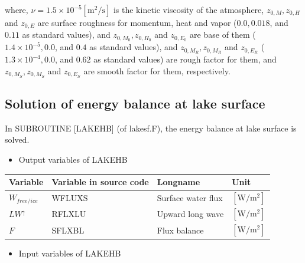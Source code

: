 where, \(\nu = 1.5 \times 10^{-5} \mathrm{[m^2/s]}\) is the kinetic viscosity of the atmosphere, \(z_{0,M},z_{0,H}\) and \(z_{0,E}\) are surface roughness for momentum, heat and vapor (\(0.0, 0.018\),
and \(0.11\) as standard values), and \(z_{0,M_0},z_{0,H_0}\) and \(z_{0,E_0}\) are base of them (\(1.4\times 10^{-5}, 0.0\), and \(0.4\) as standard values), and \(z_{0,M_R},z_{0,M_R}\) and
\(z_{0,E_R}\) (\(1.3\times10^{-4}, 0.0\), and \(0.62\) as standard values) are rough factor for them, and \(z_{0,M_S},z_{0,M_S}\) and \(z_{0,E_S}\) are smooth factor for them, respectively.

\subsection{Solution of energy balance at lake surface}\label{solution-of-energy-balance-at-lake-surface}

In SUBROUTINE {[}LAKEHB{]} (of lakesf.F), the energy balance at lake surface is solved.

\begin{itemize}
\tightlist
\item
  Output variables of LAKEHB
\end{itemize}

\begin{longtable}[]{@{}llll@{}}
\toprule\noalign{}
Variable & Variable in source code & Longname & Unit \\
\midrule\noalign{}
\endhead
\bottomrule\noalign{}
\endlastfoot
\(W_{free/ice}\) & WFLUXS & Surface water flux & \(\mathrm{[W/m^2]}\) \\
\(LW^\uparrow\) & RFLXLU & Upward long wave & \(\mathrm{[W/m^2]}\) \\
\(F\) & SFLXBL & Flux balance & \(\mathrm{[W/m^2]}\) \\
\end{longtable}

\begin{itemize}
\tightlist
\item
  Input variables of LAKEHB
\end{itemize}

